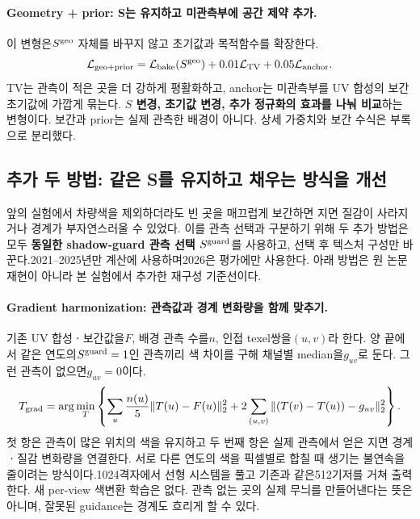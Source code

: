 \documentclass[11pt,a4paper]{article}
\begin{document}
\paragraph{Geometry + prior: S는 유지하고 미관측부에 공간 제약 추가.}
이 변형은$S^{\rm geo}$ 자체를 바꾸지 않고 초기값과 목적함수를 확장한다.
\begin{equation}
 \mathcal L_{\rm geo+prior}
 =\mathcal L_{\rm bake}(S^{\rm geo})+0.01\mathcal L_{\rm TV}+0.05\mathcal L_{\rm anchor}.
\end{equation}
TV는 관측이 적은 곳을 더 강하게 평활화하고, anchor는 미관측부를 UV 합성의 보간 초기값에 가깝게 묶는다. \textbf{$S$ 변경, 초기값 변경, 추가 정규화의 효과를 나눠 비교}하는 변형이다. 보간과 prior는 실제 관측한 배경이 아니다. 상세 가중치와 보간 수식은 부록으로 분리했다.

\subsection{추가 두 방법: 같은 S를 유지하고 채우는 방식을 개선}
앞의 실험에서 차량색을 제외하더라도 빈 곳을 매끄럽게 보간하면 지면 질감이 사라지거나 경계가 부자연스러울 수 있었다. 이를 관측 선택과 구분하기 위해 두 추가 방법은 모두 \textbf{동일한 shadow-guard 관측 선택 $S^{\rm guard}$}를 사용하고, 선택 후 텍스처 구성만 바꾼다.2021--2025년만 계산에 사용하며2026은 평가에만 사용한다. 아래 방법은 원 논문 재현이 아니라 본 실험에서 추가한 재구성 기준선이다.

\paragraph{Gradient harmonization: 관측값과 경계 변화량을 함께 맞추기.}
기존 UV 합성ㆍ보간값을$F$, 배경 관측 수를$n$, 인접 texel쌍을$(u,v)$라 한다. 양 끝에서 같은 연도의$S^{\rm guard}=1$인 관측끼리 색 차이를 구해 채널별 median을$g_{uv}$로 둔다. 그런 관측이 없으면$g_{uv}=0$이다.
\begin{equation}
 T_{\rm grad}=\arg\min_T\left\{
 \sum_u\frac{n(u)}5\|T(u)-F(u)\|_2^2
 +2\sum_{(u,v)}\|(T(v)-T(u))-g_{uv}\|_2^2\right\}.
\end{equation}
첫 항은 관측이 많은 위치의 색을 유지하고 두 번째 항은 실제 관측에서 얻은 지면 경계ㆍ질감 변화량을 연결한다. 서로 다른 연도의 색을 픽셀별로 합칠 때 생기는 불연속을 줄이려는 방식이다.1024격자에서 선형 시스템을 풀고 기존과 같은512기저를 거쳐 출력한다. 새 per-view 색변환 학습은 없다. 관측 없는 곳의 실제 무늬를 만들어낸다는 뜻은 아니며, 잘못된 guidance는 경계도 흐리게 할 수 있다.
\end{document}
